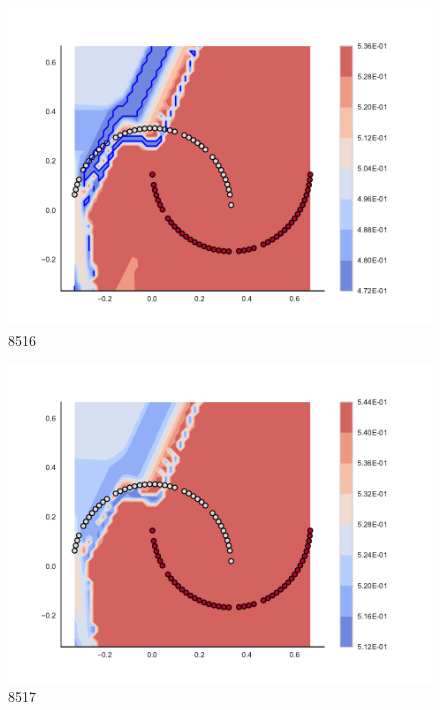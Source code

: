 \begin{subfigure}[b]{0.09\textwidth}
    \includegraphics[clip, trim=2.35cm 1.75cm 4.5cm 0cm,width=\textwidth]{img/convergence/8516.pdf}
    \caption{8516}
    \label{fig:convergence_8516}
\end{subfigure}
%
\begin{subfigure}[b]{0.09\textwidth}
    \includegraphics[clip, trim=2.35cm 1.75cm 4.5cm 0cm,width=\textwidth]{img/convergence/8517.pdf}
    \caption{8517}
    \label{fig:convergence_8517}
\end{subfigure}
%
